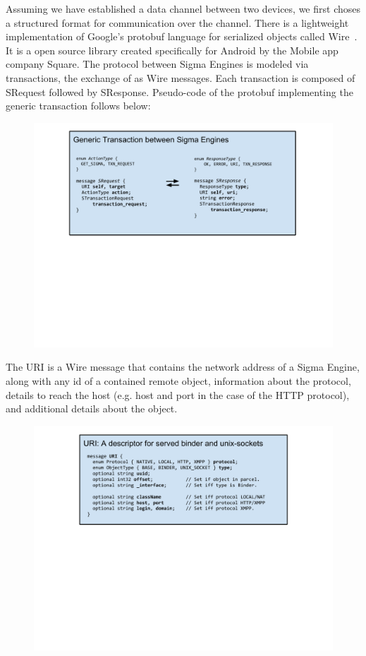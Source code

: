 \documentclass[prodmode]{acmlarge}
\begin{document}
Assuming we have established a data channel between two devices, we first choses a structured format for communication over the channel. There is a lightweight implementation of Google's protobuf language for serialized objects called Wire~\cite{Wire,IntroWire}. It is a open source library created specifically for Android by the Mobile app company Square. The protocol between Sigma Engines is modeled via transactions, the exchange of as Wire messages. Each transaction is composed of SRequest followed by SResponse. Pseudo-code of the protobuf implementing the generic transaction follows below:
\begin{figure}[h]
\centering
\includegraphics[width=\columnwidth]{drawings/WireTransaction.pdf}
\end{figure}

The URI is a Wire message that contains the network address of a Sigma Engine, along with any id of a contained remote object, information about the protocol, details to reach the host (e.g. host and port in the case of the HTTP protocol), and additional details about the object.
\begin{figure}[h]
\centering
\includegraphics[width=\columnwidth]{drawings/WireURI.pdf}
\end{figure}
\end{document}
